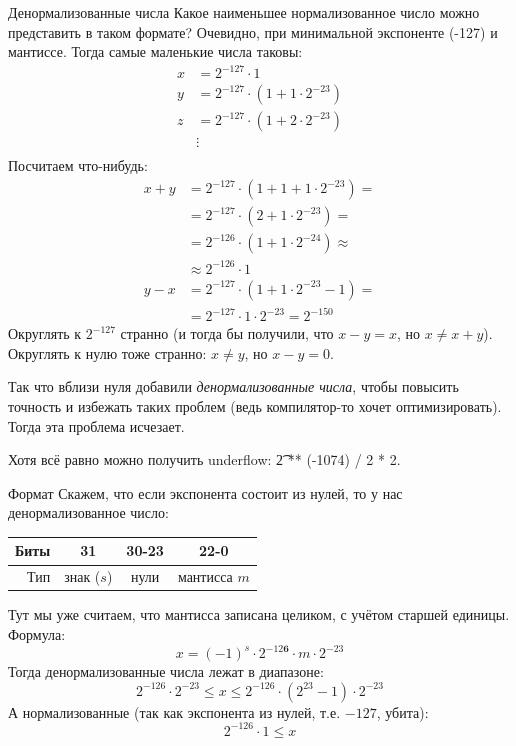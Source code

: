 \begin{frame}{Денормализованные числа}
	Какое наименьшее нормализованное число можно представить в таком формате?
	Очевидно, при минимальной экспоненте (-127) и мантиссе.
	Тогда самые маленькие числа таковы:
	\begin{align*}
		x &= 2^{-127} \cdot 1 \\
		y &= 2^{-127} \cdot (1 + 1 \cdot 2^{-23}) \\
		z &= 2^{-127} \cdot (1 + 2 \cdot 2^{-23}) \\
		& \vdots \\
	\end{align*}
	Посчитаем что-нибудь:
	\begin{align*}
		x + y &= 2^{-127} \cdot (1 + 1 + 1 \cdot 2^{-23}) = \\
		      &= 2^{-127} \cdot (2 + 1 \cdot 2^{-23}) = \\
		      &= 2^{-126} \cdot (1 + 1 \cdot 2^{-24}) \approx \\
		      &\approx 2^{-126} \cdot 1 \\
		y - x &= 2^{-127} \cdot (1 + 1 \cdot 2^{-23} - 1) = \\
		      &= 2^{-127} \cdot 1 \cdot 2^{-23} = 2^{-150}
	\end{align*}
	Округлять к $2^{-127}$ странно (и тогда бы получили, что $x-y=x$, но $x\neq x + y$).
	Округлять к нулю тоже странно: $x \neq y$, но $x - y = 0$.

	Так что вблизи нуля добавили \textit{денормализованные числа}, чтобы повысить точность и избежать таких проблем (ведь компилятор-то хочет оптимизировать).
	Тогда эта проблема исчезает.

	Хотя всё равно можно получить underflow: \t{2 ** (-1074) / 2 * 2}.
\end{frame}

\begin{frame}{Формат}
	Скажем, что если экспонента состоит из нулей, то у нас денормализованное число:
	\begin{center}
		\begin{tabular}{|r|c|c|c|}
			\hline
			Биты & 31 & 30-23 & 22-0 \\\hline
			Тип & знак ($s$) & нули & мантисса $m$ \\\hline
		\end{tabular}
	\end{center}
	Тут мы уже считаем, что мантисса записана целиком, с учётом старшей единицы.
	Формула:
	\[
		x = (-1)^s \cdot 2^{-12\textbf{6}} \cdot m \cdot 2^{-23}
	\]
	Тогда денормализованные числа лежат в диапазоне:
	\[
		2^{-126} \cdot 2^{-23} \le x \le 2^{-126} \cdot (2^{23}-1) \cdot2^{-23}
	\]
	А нормализованные (так как экспонента из нулей, т.е. $-127$, убита):
	\[
		2^{-126} \cdot 1 \le x
	\]
\end{frame}

